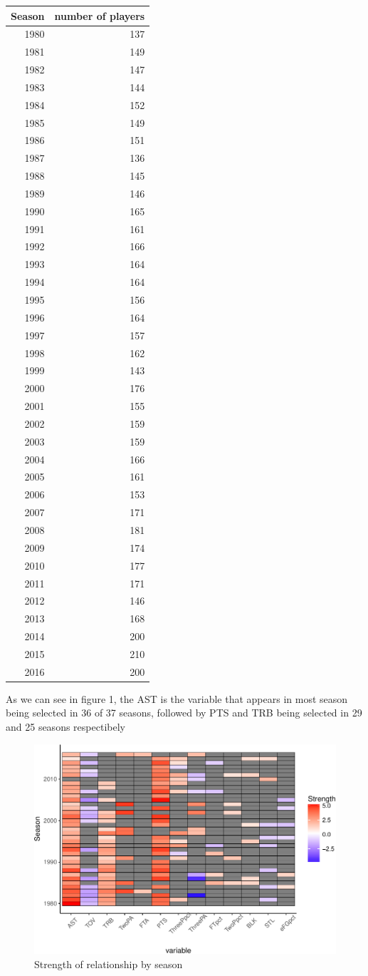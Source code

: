 \documentclass[]{elsarticle} %
\makeatletter
\def\maxwidth{\ifdim\Gin@nat@width>\linewidth\linewidth
\else\Gin@nat@width\fi}
\let\Oldincludegraphics\includegraphics
\renewcommand{\includegraphics}[1]{\Oldincludegraphics[width=\maxwidth]{#1}}
\makeatother
\begin{document}
\begin{longtable}[c]{@{}rr@{}}
\toprule
Season & number of players\tabularnewline
\midrule
\endhead
1980 & 137\tabularnewline
1981 & 149\tabularnewline
1982 & 147\tabularnewline
1983 & 144\tabularnewline
1984 & 152\tabularnewline
1985 & 149\tabularnewline
1986 & 151\tabularnewline
1987 & 136\tabularnewline
1988 & 145\tabularnewline
1989 & 146\tabularnewline
1990 & 165\tabularnewline
1991 & 161\tabularnewline
1992 & 166\tabularnewline
1993 & 164\tabularnewline
1994 & 164\tabularnewline
1995 & 156\tabularnewline
1996 & 164\tabularnewline
1997 & 157\tabularnewline
1998 & 162\tabularnewline
1999 & 143\tabularnewline
2000 & 176\tabularnewline
2001 & 155\tabularnewline
2002 & 159\tabularnewline
2003 & 159\tabularnewline
2004 & 166\tabularnewline
2005 & 161\tabularnewline
2006 & 153\tabularnewline
2007 & 171\tabularnewline
2008 & 181\tabularnewline
2009 & 174\tabularnewline
2010 & 177\tabularnewline
2011 & 171\tabularnewline
2012 & 146\tabularnewline
2013 & 168\tabularnewline
2014 & 200\tabularnewline
2015 & 210\tabularnewline
2016 & 200\tabularnewline
\bottomrule
\end{longtable}

As we can see in figure 1, the AST is the variable that appears in most
season being selected in 36 of 37 seasons, followed by PTS and TRB being
selected in 29 and 25 seasons respectibely

\begin{figure}[htbp]
\centering
\includegraphics{Coaching_Selection_files/figure-latex/unnamed-chunk-5-1.pdf}
\caption{Strength of relationship by season}
\end{figure}
\end{document}
